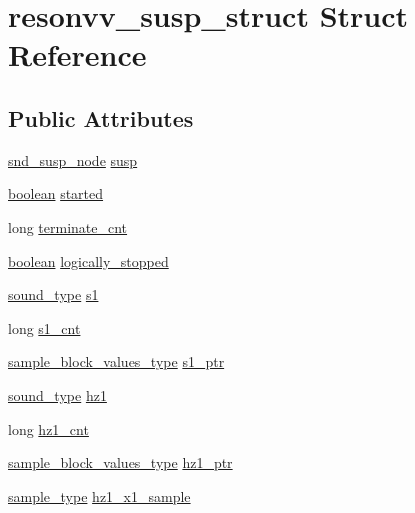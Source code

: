 \hypertarget{structresonvv__susp__struct}{}\section{resonvv\+\_\+susp\+\_\+struct Struct Reference}
\label{structresonvv__susp__struct}
\subsection*{Public Attributes}
\begin{DoxyCompactItemize}
\item 
\hyperlink{sound_8h_a6b268203688a934bd798ceb55f85d4c0}{snd\+\_\+susp\+\_\+node} \hyperlink{structresonvv__susp__struct_a2be5185ac1dc23f1a67a1ab41aaab85b}{susp}
\item 
\hyperlink{cext_8h_a7670a4e8a07d9ebb00411948b0bbf86d}{boolean} \hyperlink{structresonvv__susp__struct_afd8f76ca24848eb9066c84cd39e46185}{started}
\item 
long \hyperlink{structresonvv__susp__struct_aa141749bb5e93e9a6846e70752ae8a29}{terminate\+\_\+cnt}
\item 
\hyperlink{cext_8h_a7670a4e8a07d9ebb00411948b0bbf86d}{boolean} \hyperlink{structresonvv__susp__struct_a926f67522f34a8eb150b06737a98999c}{logically\+\_\+stopped}
\item 
\hyperlink{sound_8h_a792cec4ed9d6d636d342d9365ba265ea}{sound\+\_\+type} \hyperlink{structresonvv__susp__struct_a07b16b9e007b3f6efc2a31a57c9e16c3}{s1}
\item 
long \hyperlink{structresonvv__susp__struct_a92b27cffa1a042ad560f8811abdead54}{s1\+\_\+cnt}
\item 
\hyperlink{sound_8h_a83d17f7b465d1591f27cd28fc5eb8a03}{sample\+\_\+block\+\_\+values\+\_\+type} \hyperlink{structresonvv__susp__struct_a4427c5d3c8b76f5fa11e60b0c32f8e93}{s1\+\_\+ptr}
\item 
\hyperlink{sound_8h_a792cec4ed9d6d636d342d9365ba265ea}{sound\+\_\+type} \hyperlink{structresonvv__susp__struct_a8245c0985ae57f32828544b157d6349f}{hz1}
\item 
long \hyperlink{structresonvv__susp__struct_a3a40dccd27656874e1166eaa859bdbfb}{hz1\+\_\+cnt}
\item 
\hyperlink{sound_8h_a83d17f7b465d1591f27cd28fc5eb8a03}{sample\+\_\+block\+\_\+values\+\_\+type} \hyperlink{structresonvv__susp__struct_a77d30a5293a7d98f4bc0dea05f6f2d9f}{hz1\+\_\+ptr}
\item 
\hyperlink{sound_8h_a3a9d1d4a1c153390d2401a6e9f71b32c}{sample\+\_\+type} \hyperlink{structresonvv__susp__struct_a27ffe856ae233dae1662b98ecc38a1d8}{hz1\+\_\+x1\+\_\+sample}

\end{DoxyCompactItemize}
